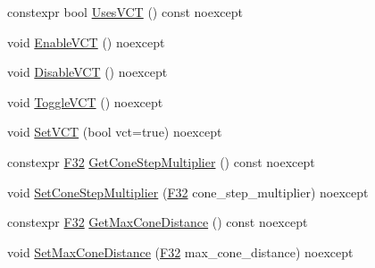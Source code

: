 \begin{DoxyCompactItemize}
\item 
constexpr bool \mbox{\hyperlink{classmage_1_1rendering_1_1_voxelization_settings_a50ce0473e8e9fd22527d4f295c023176}{Uses\+V\+CT}} () const noexcept
\item 
void \mbox{\hyperlink{classmage_1_1rendering_1_1_voxelization_settings_a1f08a9e6c02ce6c3e392cdb1ad30f75e}{Enable\+V\+CT}} () noexcept
\item 
void \mbox{\hyperlink{classmage_1_1rendering_1_1_voxelization_settings_a7092d02a0878dad9ec4fa21ce1024147}{Disable\+V\+CT}} () noexcept
\item 
void \mbox{\hyperlink{classmage_1_1rendering_1_1_voxelization_settings_a930c8f4d3723e67e8cbfc2b41533ead8}{Toggle\+V\+CT}} () noexcept
\item 
void \mbox{\hyperlink{classmage_1_1rendering_1_1_voxelization_settings_a394b58dd3d414a406fd874f7e53b211f}{Set\+V\+CT}} (bool vct=true) noexcept
\item 
constexpr \mbox{\hyperlink{namespacemage_aa97e833b45f06d60a0a9c4fc22ae02c0}{F32}} \mbox{\hyperlink{classmage_1_1rendering_1_1_voxelization_settings_a672f561214738cbb64252b332e717693}{Get\+Cone\+Step\+Multiplier}} () const noexcept
\item 
void \mbox{\hyperlink{classmage_1_1rendering_1_1_voxelization_settings_a9eafb3795d3e8248196dd7e9c6d32671}{Set\+Cone\+Step\+Multiplier}} (\mbox{\hyperlink{namespacemage_aa97e833b45f06d60a0a9c4fc22ae02c0}{F32}} cone\+\_\+step\+\_\+multiplier) noexcept
\item 
constexpr \mbox{\hyperlink{namespacemage_aa97e833b45f06d60a0a9c4fc22ae02c0}{F32}} \mbox{\hyperlink{classmage_1_1rendering_1_1_voxelization_settings_aa79b36e2c7ef50513548512f2cedfb6b}{Get\+Max\+Cone\+Distance}} () const noexcept
\item 
void \mbox{\hyperlink{classmage_1_1rendering_1_1_voxelization_settings_a137c4c2186b5034f546d0b876cd0633e}{Set\+Max\+Cone\+Distance}} (\mbox{\hyperlink{namespacemage_aa97e833b45f06d60a0a9c4fc22ae02c0}{F32}} max\+\_\+cone\+\_\+distance) noexcept
\end{DoxyCompactItemize}
